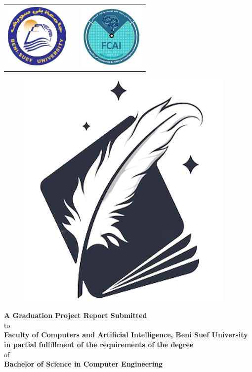 \pagecolor{gpCoverBGColor}\afterpage{\nopagecolor}
\thispagestyle{empty}
{\color{gpCoverTextColor}

\begin{table}[h]
    \centering
    \begin{tabular}{c p{} c}
    \includegraphics[width=1.25in]{images/BSU-logo.png}
    &
    &
    \includegraphics[width=1.3in]{images/FCAI-logo.png}
    \end{tabular}
\end{table}

\begin{center}
    \vspace{10pt}
    {\fontsize{32}{50} \selectfont \textbf{\gpProject{}}}
    \vspace{15pt}
    
    \begin{figure}[H]
    \centering
    \includegraphics[width=0.3\linewidth]{images/logo.png}
    \label{fig:logo}
    \end{figure}

    \vspace{10pt}
    \textbf{A Graduation Project Report Submitted}
    \vspace{3pt}\\
    to
    \vspace{3pt}\\
    \textbf{Faculty of Computers and Artificial Intelligence, Beni Suef University} 
    \vspace{3pt}\\
    \textbf{in partial fulfillment of the requirements of the degree}
    \vspace{3pt}\\
    of
    \vspace{3pt}\\
    \textbf{Bachelor of Science in Computer Engineering}
    \vspace{10pt}
    

\end{center}}
